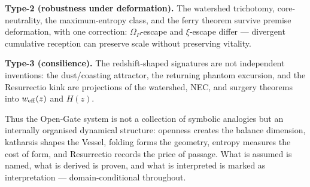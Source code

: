 \documentclass[11pt,a4paper,oneside]{book}
\newcommand{\Op}{\Omega_P}
\newcommand{\weff}{w_{\rm eff}}
\theoremstyle{plain}
\theoremstyle{definition}
\theoremstyle{remark}
\begin{document}
\textbf{Type-2 (robustness under deformation).} The watershed trichotomy, core-neutrality, the
maximum-entropy class, and the ferry theorem survive premise deformation, with one correction:
$\Op$-escape and $\xi$-escape differ --- divergent cumulative reception can preserve scale without
preserving vitality.

\textbf{Type-3 (consilience).} The redshift-shaped signatures are not independent inventions: the
dust/coasting attractor, the returning phantom excursion, and the Resurrectio kink are projections of
the watershed, NEC, and surgery theorems into $\weff(z)$ and $H(z)$.

Thus the Open-Gate system is not a collection of symbolic analogies but an internally organised
dynamical structure: openness creates the balance dimension, katharsis shapes the Vessel, folding forms
the geometry, entropy measures the cost of form, and Resurrectio records the price of passage. What is
assumed is named, what is derived is proven, and what is interpreted is marked as interpretation ---
domain-conditional throughout.
\end{document}
